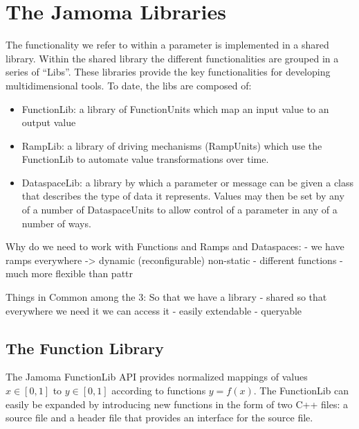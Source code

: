 \documentclass{article}
\begin{document}



\section{The Jamoma Libraries} %
\label{sec:the_jamoma_libraries}

The functionality we refer to within a parameter is implemented in a shared library. Within the shared library the different functionalities are grouped in a series of ``Libs''.  These libraries provide the key functionalities for developing multidimensional tools.  To date, the libs are composed of:
\begin{itemize}
	\item FunctionLib: a library of FunctionUnits which map an input value to an output value
	\item RampLib: a library of driving mechanisms (RampUnits) which use the FunctionLib to automate value transformations over time.
	\item DataspaceLib: a library by which a parameter or message can be given a class that describes the type of data it represents.  Values may then be set by any of a number of DataspaceUnits to allow control of a parameter in any of a number of ways.
\end{itemize}



Why do we need to work with Functions and Ramps and Dataspaces:
- we have ramps everywhere -> dynamic (reconfigurable) non-static
    - different functions
    - much more flexible than pattr
    

Things in Common among the 3:
So that we have a library
- shared so that everywhere we need it we can access it
- easily extendable
- queryable



\subsection{The Function Library} %
\label{sec:functionlib}
The Jamoma FunctionLib API provides normalized mappings of values $x \in [0,1]$ to $y \in [0,1]$ according to functions $y = f(x)$. The FunctionLib can easily be expanded by introducing new functions in the form of two C++ files: a source file and a header file that provides an interface for the source file.
\end{document}
